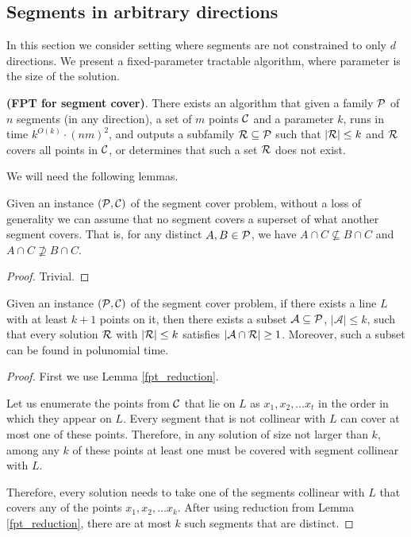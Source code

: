 \subsection{Segments in arbitrary directions}
In this section we consider setting where segments are not constrained
to only $d$ directions. 
We present a fixed-parameter tractable algorithm,
where parameter is the size of the solution.

\label{segments_in_arbitrary_direction}
\begin{tw}{
	\label{segment_cover_fpt}
	\textbf{(FPT for segment cover)}.
	There exists an algorithm that given a family $\mathcal{P}$ of
	$n$ segments (in any direction),
	a set of $m$ points $\mathcal{C}$
	and a parameter $k$,
	runs in time $k^{O(k)} \cdot (nm)^2$,
	and outputs a subfamily $\mathcal{R} \subseteq \mathcal{P}$
	such that $|\mathcal{R}| \le k$ and $\mathcal{R}$ covers all points in $\mathcal{C}$,
	or determines that such a set $\mathcal{R}$ does not exist.
}\end{tw}

We will need the following lemmas.

\begin{lemma}
   \label{fpt_reduction}
   Given an instance $(\mathcal{P}, \mathcal{C})$ of the segment cover problem,
   without a loss of generality we can assume that
   no segment covers a superset of what another segment covers.
   That is, for any distinct $A, B \in \mathcal{P}$, we have
   $A \cap C \not \subseteq B \cap C$ and $A \cap C \not \supseteq B \cap C$.
\end{lemma}   
   
\begin{proof} Trivial. \end{proof}

\begin{lemma}
	\label{fpt_long_lines}
	Given an instance $(\mathcal{P}, \mathcal{C})$ of the segment cover problem,
	if there exists a line $L$ with at least
	$k+1$ points on it, then there exists a subset $\mathcal{A} \subseteq \mathcal{P}$,
	$|\mathcal{A}| \le k$,
	such that every solution $\mathcal{R}$ with $|\mathcal{R}| \le k$
	satisfies $|\mathcal{A} \cap \mathcal{R}| \ge 1$.
	Moreover, such a subset can be found in polunomial time.
\end{lemma}

\begin{proof}

First we use Lemma \ref{fpt_reduction}.

Let us enumerate the points from $\mathcal{C}$ that lie on $L$ as $x_1, x_2, \ldots x_t$
in the order in which they appear on $L$.
Every segment that is not collinear with $L$ can cover at most one of these
points. Therefore, in any solution of size not larger than $k$,
among any $k$ of these points at least one must
be covered with segment collinear with $L$.

Therefore, every solution needs to take one of the segments collinear
with $L$ that covers any of the points
$x_1, x_2, \ldots x_k$. After using reduction from Lemma \ref{fpt_reduction},
there are at most $k$ such segments that are distinct.
\end{proof}

